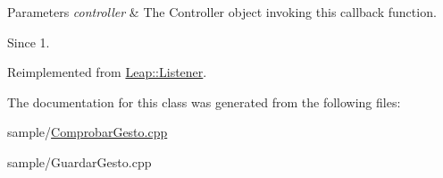 \begin{DoxyParams}{Parameters}
{\em controller} & The Controller object invoking this callback function. \\
\hline
\end{DoxyParams}
\begin{DoxySince}{Since}
1. 
\end{DoxySince}


Reimplemented from \hyperlink{class_leap_1_1_listener_a894976a7ff7a101a08c9b88a43ec367b}{Leap\+::\+Listener}.



The documentation for this class was generated from the following files\+:\begin{DoxyCompactItemize}
\item 
sample/\hyperlink{_comprobar_gesto_8cpp}{Comprobar\+Gesto.\+cpp}\item 
sample/Guardar\+Gesto.\+cpp\end{DoxyCompactItemize}
